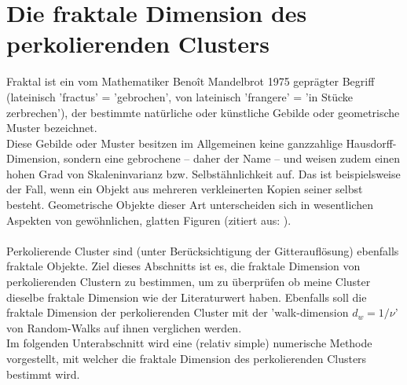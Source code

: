 \documentclass[a4paper, 12pt]{report}
\begin{document}
\section{Die fraktale Dimension des perkolierenden Clusters}
Fraktal ist ein vom Mathematiker Benoît Mandelbrot 1975 geprägter Begriff (lateinisch 'fractus' = 'gebrochen', von lateinisch 'frangere' = 'in Stücke zerbrechen'), der bestimmte natürliche oder künstliche Gebilde oder geo\-metrische Muster bezeichnet.
\\
\noindent Diese Gebilde oder Muster besitzen im Allgemeinen keine ganzzahlige Hausdorff-Dimension, sondern eine gebrochene -- daher der Name -- und weisen zudem einen hohen Grad von Skaleninvarianz bzw. Selbstähnlichkeit auf. Das ist beispielsweise der Fall, wenn ein Objekt aus mehreren verkleinerten Kopien seiner selbst besteht. Geometrische Objekte dieser Art unterscheiden sich in wesentlichen Aspekten von gewöhnlichen, glatten Figuren (zitiert aus: \cite{Fraktal_wiki}).
\\
\\
\noindent Perkolierende Cluster sind (unter Berücksichtigung der Gitterauflösung) ebenfalls fraktale Objekte. Ziel dieses Abschnitts ist es, die fraktale Dimension von perkolierenden Clustern zu bestimmen, um zu überprüfen ob meine Cluster dieselbe fraktale Dimension wie der Literaturwert haben. Ebenfalls soll die fraktale Dimension der perkolierenden Cluster mit der 'walk-dimension $d_w=1/\nu$' von Random-Walks auf ihnen verglichen werden. 
\\
Im folgenden Unterabschnitt wird eine (relativ simple) numerische Methode vorgestellt, mit welcher die fraktale Dimension des perkolierenden Clusters bestimmt wird.
\end{document}
